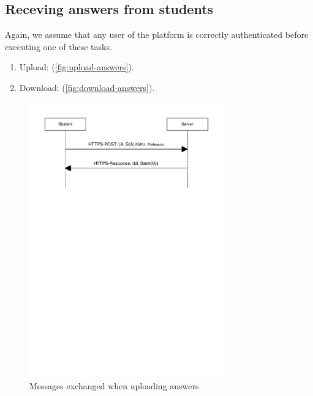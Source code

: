 \documentclass[12pt]{article}
\begin{document}
\subsection{Receving answers from students}
\label{subsec:impl-answers}

Again, we assume that any user of the platform is correctly authenticated before
executing one of these tasks.


\begin{enumerate}
\item Upload: (\autoref{fig:upload-answers}).
\item Download: (\autoref{fig:download-answers}).
\end{enumerate}

\begin{figure}
  \begin{center}
  \includegraphics[width=0.75\textwidth]{images/upload_answers.pdf}
  \caption{Messages exchanged when uploading answers}
  \label{fig:upload-answers}
  \end{center}
\end{figure}

\end{document}

